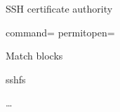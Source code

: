     \begin{iframe}[Homework]
    \item SSH certificate authority
    \item command= permitopen=
    \item Match blocks
    \item sshfs
    \item \dots
    \end{iframe}











\contactSlide

